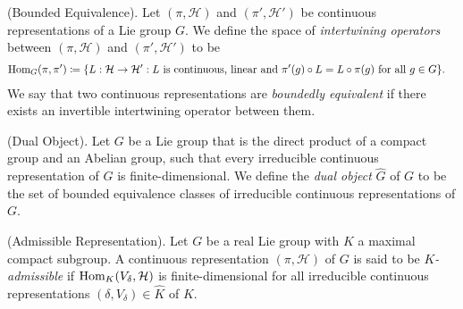 \noindent\begin{definition}\textup{(Bounded Equivalence).} Let $(\pi, \mathcal{H})$ and $(\pi', \mathcal{H}')$ be continuous representations of a Lie group $G$. We define the space of {\em intertwining operators} between $(\pi, \mathcal{H})$ and $(\pi', \mathcal{H}')$ to be
\begin{align*}
\begin{split}
\homset_G(\pi, \pi') %
&\coloneqq \{L : \mathcal{H} \to \mathcal{H}' : \textup{$L$ is continuous, linear and $\pi'(g) \circ L = L \circ \pi(g)$ for all $g \in G$}\}.
\end{split}
\end{align*}
We say that two continuous representations are {\em boundedly equivalent} if there exists an invertible intertwining operator between them.\\
\end{definition}

\noindent\begin{definition}\textup{(Dual Object).} Let $G$ be a Lie group that is the direct product of a compact group and an Abelian group, such that every irreducible continuous representation of $G$ is finite-dimensional. We define the {\em dual object} $\widehat{G}$ of $G$ to be the set of bounded equivalence classes of irreducible continuous representations of $G$.\\
\end{definition}

\noindent\begin{definition}\textup{(Admissible Representation).} Let $G$ be a real Lie group with $K$ a maximal compact subgroup. A continuous representation $(\pi, \mathcal{H})$ of $G$ is said to be {\em $K$-admissible} if $\textup{Hom}_K(V_\delta, \mathcal{H})$ is finite-dimensional for all irreducible continuous representations $(\delta, V_\delta) \in \widehat{K}$ of $K$.\\%
\end{definition}

